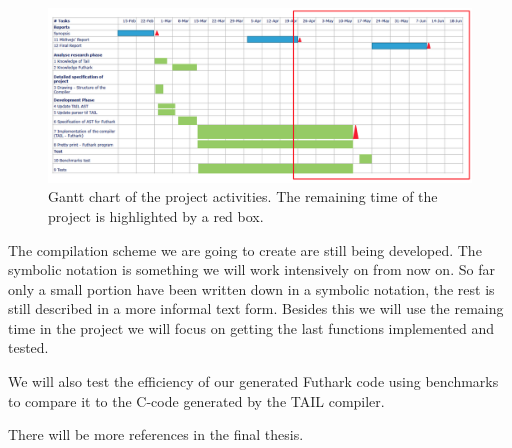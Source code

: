 \documentclass[11pt]{article}
\begin{document}
\begin{figure}[width=\textwidth]%
    \centering
    \includegraphics[width=\textwidth]{midvejsgantt3.png}
    \caption{Gantt chart of the project activities. The remaining time of the project is highlighted by a red box.}
    \label{fig:gantt}
\end{figure}

The compilation scheme we are going to create are still being developed. The symbolic notation is something we will work intensively on from now on. So far only a small portion have been written down in a symbolic notation, the rest is still described in a more informal text form. 
Besides this we will use the remaing time in the project we will focus on getting the last functions implemented and tested.

We will also test the efficiency of our generated Futhark code using benchmarks to compare it to the C-code generated by the TAIL compiler. 



{}


There will be more references in the final thesis. 
\end{document}
